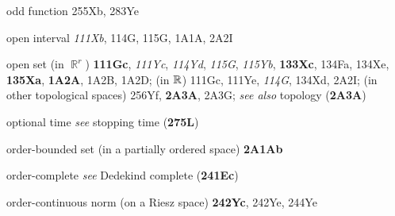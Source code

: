 odd function 255Xb, 283Ye























open interval {\it 111Xb}, 114G, 115G, 1A1A,
  2A2I
  



open set (in $\BbbR^r$) {\bf 111Gc}, {\it 111Yc}, {\it 114Yd}, {\it 115G},
{\it 115Yb}, {\bf 133Xc}, 134Fa, 134Xe,
{\bf 135Xa}, {\bf 1A2A}, 1A2B, 1A2D;
  (in $\Bbb R$) 111Gc, 111Ye, {\it 114G}, 134Xd, 2A2I;
  (in other topological spaces) 256Yf, {\bf 2A3A}, 2A3G;
  {\it see also} topology ({\bf 2A3A})








optional time {\it see} stopping time ({\bf 275L}) 














order-bounded set (in a partially ordered space) {\bf 2A1Ab}















order-complete {\it see} Dedekind complete ({\bf 241Ec})








order-continuous norm (on a Riesz space) {\bf 242Yc}, 242Ye,
244Ye












